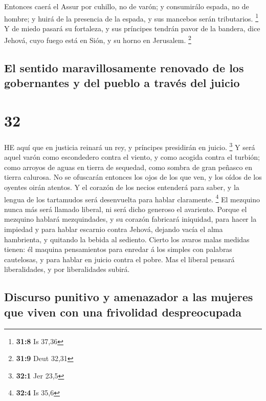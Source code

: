  Entonces caerá el Assur por cuhillo, no de varón; y
consumirálo espada, no de hombre; y huirá de la presencia de la espada,
y sus mancebos serán tributarios. \footnote{\textbf{31:8} Is 37,36}
 Y de miedo pasará su fortaleza, y sus príncipes tendrán
pavor de la bandera, dice Jehová, cuyo fuego está en Sión, y su horno en
Jerusalem. \footnote{\textbf{31:9} Deut 32,31}

\hypertarget{el-sentido-maravillosamente-renovado-de-los-gobernantes-y-del-pueblo-a-travuxe9s-del-juicio}{%
\subsection{El sentido maravillosamente renovado de los gobernantes y
del pueblo a través del
juicio}\label{el-sentido-maravillosamente-renovado-de-los-gobernantes-y-del-pueblo-a-travuxe9s-del-juicio}}

\hypertarget{section-31}{%
\section{32}\label{section-31}}

 HE aquí que en justicia reinará un rey, y príncipes
presidirán en juicio. \footnote{\textbf{32:1} Jer 23,5}  Y
será aquel varón como escondedero contra el viento, y como acogida
contra el turbión; como arroyos de aguas en tierra de sequedad, como
sombra de gran peñasco en tierra calurosa.  No se ofuscarán
entonces los ojos de los que ven, y los oídos de los oyentes oirán
atentos.  Y el corazón de los necios entenderá para saber, y
la lengua de los tartamudos será desenvuelta para hablar claramente.
\footnote{\textbf{32:4} Is 35,6}  El mezquino nunca más será
llamado liberal, ni será dicho generoso el avariento. 
Porque el mezquino hablará mezquindades, y su corazón fabricará
iniquidad, para hacer la impiedad y para hablar escarnio contra Jehová,
dejando vacía el alma hambrienta, y quitando la bebida al sediento.
 Cierto los avaros malas medidas tienen: él maquina
pensamientos para enredar á los simples con palabras cautelosas, y para
hablar en juicio contra el pobre.  Mas el liberal pensará
liberalidades, y por liberalidades subirá.

\hypertarget{discurso-punitivo-y-amenazador-a-las-mujeres-que-viven-con-una-frivolidad-despreocupada}{%
\subsection{Discurso punitivo y amenazador a las mujeres que viven con
una frivolidad
despreocupada}\label{discurso-punitivo-y-amenazador-a-las-mujeres-que-viven-con-una-frivolidad-despreocupada}}

